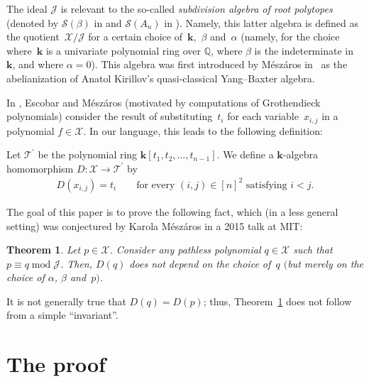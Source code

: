 \documentclass[pdftex]{sigma}
\newtheorem{Theorem}{Theorem}[section]
\numberwithin{equation}{section}
\begin{document}
The ideal $\mathcal{J}$ is relevant to the so-called \textit{subdivision algebra of root polytopes} (denoted by $\mathcal{S}(\beta) $ in \cite[Section~5]{EscMes15} and $\mathcal{S}(A_{n}) $ in \cite[Section~1]{Meszar09}). Namely, this latter algebra is defined as the quotient~$\mathcal{X}/\mathcal{J}$ for a certain choice of~$\mathbf{k}$,~$\beta$ and~$\alpha$ (namely, for the choice where~$\mathbf{k}$ is a univariate polynomial ring over $\mathbb{Q}$, where $\beta$ is the indeterminate in~$\mathbf{k}$, and where $\alpha=0$). This algebra was first introduced by M\'{e}sz\'{a}ros in~\cite{Meszar09} as the abelianization of Anatol Kirillov's quasi-classical
Yang--Baxter algebra.

In \cite[Section~5 and Appendix~A]{EscMes15}, Escobar and M\'{e}sz\'{a}ros (motivated by computations of Grothendieck polynomials) consider the result of substituting~$t_{i}$ for each variable~$x_{i,j}$ in a polynomial $f\in\mathcal{X}$. In our language, this leads to the following definition:

\begin{Definition}Let $\mathcal{T}^{\prime}$ be the polynomial ring $\mathbf{k} [ t_{1},t_{2},\ldots,t_{n-1}] $. We define a $\mathbf{k}$-algebra homomorphism $D\colon \mathcal{X}\rightarrow\mathcal{T}^{\prime}$ by
\begin{gather*}
D ( x_{i,j} ) =t_{i}\qquad \text{for every } (i,j) \in[n] ^{2}\text{ satisfying }i<j.
\end{gather*}
\end{Definition}

The goal of this paper is to prove the following fact, which (in a less general setting) was conjectured by Karola M\'{e}sz\'{a}ros in a 2015 talk at MIT:

\begin{Theorem}\label{thm.t-red.unique}Let $p\in\mathcal{X}$. Consider any pathless polynomial $q\in\mathcal{X}$ such that $p\equiv q\operatorname{mod} \mathcal{J}$. Then, $D(q) $ does not depend on the choice of~$q$ $($but merely on the choice of $\alpha$, $\beta$ and~$p)$.
\end{Theorem}

It is not generally true that $D(q) =D(p) $; thus, Theorem~\ref{thm.t-red.unique} does not follow from a simple ``invariant''.

\section{The proof}\label{sect.proof}
\end{document}
